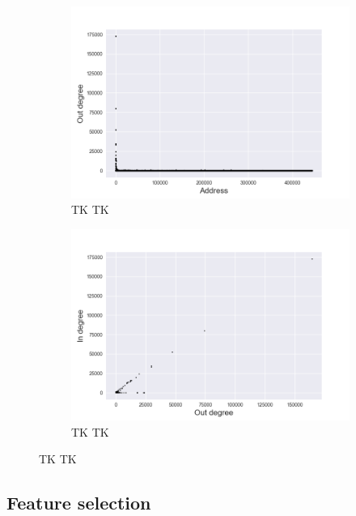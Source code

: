 \documentclass{article} %
\begin{document}
\begin{figure}
\centering
\begin{subfigure}{.5\textwidth}
    \centering
    \includegraphics[width=1\linewidth]{figures/degree_address}
    \caption{\small TK TK}
    \label{fig:degree_address}
\end{subfigure}%
\begin{subfigure}{.5\textwidth}
    \centering
    \includegraphics[width=1\linewidth]{figures/in_out_degree}
    \caption{\small TK TK}
    \label{fig:in_out_degree}
\end{subfigure}
\caption{\small TK TK}
\label{fig:test}
\end{figure}

\subsection{Feature selection}
\end{document}
